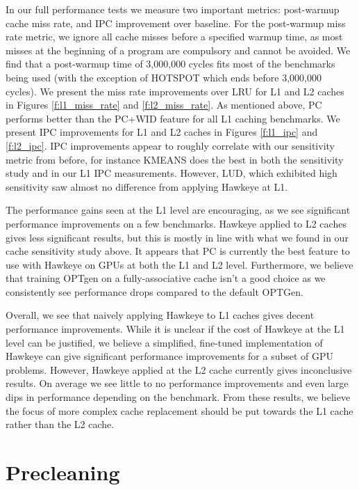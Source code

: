 In our full performance tests we measure two important metrics: post-warmup cache miss rate, and IPC improvement over baseline. For the post-warmup miss rate metric, we ignore all cache misses before a specified warmup time, as most misses at the beginning of a program are compulsory and cannot be avoided. We find that a post-warmup time of 3,000,000 cycles fits most of the benchmarks being used (with the exception of HOTSPOT which ends before 3,000,000 cycles). We present the miss rate improvements over LRU for L1 and L2 caches in Figures \ref{f:l1_miss_rate} and \ref{f:l2_miss_rate}. As mentioned above, PC performs better than the PC+WID feature for all L1 caching benchmarks. We present IPC improvements for L1 and L2 caches in Figures \ref{f:l1_ipc} and \ref{f:l2_ipc}. IPC improvements appear to roughly correlate with our sensitivity metric from before, for instance KMEANS does the best in both the sensitivity study and in our L1 IPC measurements. However, LUD, which exhibited high sensitivity saw almost no difference from applying Hawkeye at L1.

The performance gains seen at the L1 level are encouraging, as we see significant performance improvements on a few benchmarks. Hawkeye applied to L2 caches gives less significant results, but this is mostly in line with what we found in our cache sensitivity study above. It appears that PC is currently the best feature to use with Hawkeye on GPUs at both the L1 and L2 level. Furthermore, we believe that training OPTgen on a fully-associative cache isn't a good choice as we consistently see performance drops compared to the default OPTGen.

Overall, we see that naively applying Hawkeye to L1 caches gives decent performance improvements. While it is unclear if the cost of Hawkeye at the L1 level can be justified, we believe a simplified, fine-tuned implementation of Hawkeye can give significant performance improvements for a subset of GPU problems. However, Hawkeye applied at the L2 cache currently gives inconclusive results. On average we see little to no performance improvements and even large dips in performance depending on the benchmark. From these results, we believe the focus of more complex cache replacement should be put towards the L1 cache rather than the L2 cache.

\section{Precleaning}

